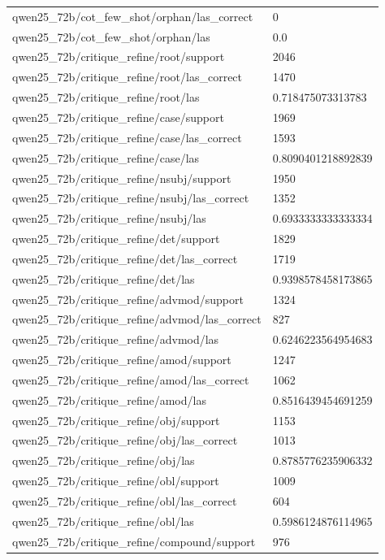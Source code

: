 \begin{tabular}{ll}
qwen25\_72b/cot\_few\_shot/orphan/las\_correct & 0 \\
qwen25\_72b/cot\_few\_shot/orphan/las & 0.0 \\
qwen25\_72b/critique\_refine/root/support & 2046 \\
qwen25\_72b/critique\_refine/root/las\_correct & 1470 \\
qwen25\_72b/critique\_refine/root/las & 0.718475073313783 \\
qwen25\_72b/critique\_refine/case/support & 1969 \\
qwen25\_72b/critique\_refine/case/las\_correct & 1593 \\
qwen25\_72b/critique\_refine/case/las & 0.8090401218892839 \\
qwen25\_72b/critique\_refine/nsubj/support & 1950 \\
qwen25\_72b/critique\_refine/nsubj/las\_correct & 1352 \\
qwen25\_72b/critique\_refine/nsubj/las & 0.6933333333333334 \\
qwen25\_72b/critique\_refine/det/support & 1829 \\
qwen25\_72b/critique\_refine/det/las\_correct & 1719 \\
qwen25\_72b/critique\_refine/det/las & 0.9398578458173865 \\
qwen25\_72b/critique\_refine/advmod/support & 1324 \\
qwen25\_72b/critique\_refine/advmod/las\_correct & 827 \\
qwen25\_72b/critique\_refine/advmod/las & 0.6246223564954683 \\
qwen25\_72b/critique\_refine/amod/support & 1247 \\
qwen25\_72b/critique\_refine/amod/las\_correct & 1062 \\
qwen25\_72b/critique\_refine/amod/las & 0.8516439454691259 \\
qwen25\_72b/critique\_refine/obj/support & 1153 \\
qwen25\_72b/critique\_refine/obj/las\_correct & 1013 \\
qwen25\_72b/critique\_refine/obj/las & 0.8785776235906332 \\
qwen25\_72b/critique\_refine/obl/support & 1009 \\
qwen25\_72b/critique\_refine/obl/las\_correct & 604 \\
qwen25\_72b/critique\_refine/obl/las & 0.5986124876114965 \\
qwen25\_72b/critique\_refine/compound/support & 976 \\

\end{tabular}
